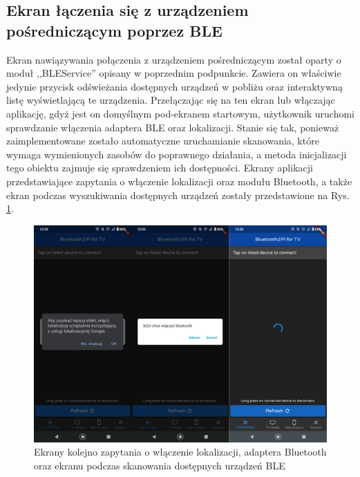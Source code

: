 \documentclass[12pt,twoside,draft]{article}
\begin{document}
\subsection{Ekran łączenia się z urządzeniem pośredniczącym poprzez BLE}
Ekran nawiązywania połączenia z urządzeniem pośredniczącym został oparty o moduł ,,BLEService'' opisany w poprzednim podpunkcie. Zawiera on właściwie jedynie przycisk odświeżania dostępnych urządzeń w pobliżu oraz interaktywną listę wyświetlającą te urządzenia.
Przełączając się na ten ekran lub włączając aplikację, gdyż jest on domyślnym pod-ekranem startowym, użytkownik uruchomi sprawdzanie włączenia adaptera BLE oraz lokalizacji. Stanie się tak, ponieważ zaimplementowane zostało automatyczne uruchamianie skanowania, które wymaga wymienionych zasobów do poprawnego działania, a metoda inicjalizacji tego obiektu zajmuje się sprawdzeniem ich dostępności. Ekrany aplikacji przedstawiające zapytania o włączenie lokalizacji oraz modułu Bluetooth, a także ekran podczas wyszukiwania dostępnych urządzeń zostały przedstawione na Rys. \ref*{Fig:initBLE}.
\begin{figure}[ht]
   \centering
   \includegraphics[width=14cm]{images/initBLE.png}
   \caption{Ekrany kolejno zapytania o włączenie lokalizacji, adaptera Bluetooth oraz ekranu podczas skanowania dostępnych urządzeń BLE}
   \label{Fig:initBLE}
\end{figure}
\end{document}

